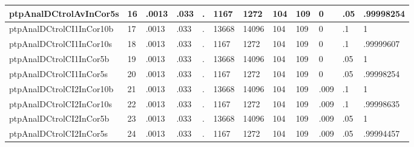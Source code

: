 \begin{table}[htbp]
\begin{tabular}{|l|l|l|l|l|l|l|l|l|l|l|l|}
ptpAnalDCtrolAvInCor5s & 16 & .0013 & .033 & . & 1167 & 1272 & 104 & 109 & 0 & .05 & .99998254 \\ \hline 
ptpAnalDCtrolCI1InCor10b & 17 & .0013 & .033 & . & 13668 & 14096 & 104 & 109 & 0 & .1 & 1 \\ \hline 
ptpAnalDCtrolCI1InCor10s & 18 & .0013 & .033 & . & 1167 & 1272 & 104 & 109 & 0 & .1 & .99999607 \\ \hline 
ptpAnalDCtrolCI1InCor5b & 19 & .0013 & .033 & . & 13668 & 14096 & 104 & 109 & 0 & .05 & 1 \\ \hline 
ptpAnalDCtrolCI1InCor5s & 20 & .0013 & .033 & . & 1167 & 1272 & 104 & 109 & 0 & .05 & .99998254 \\ \hline 
ptpAnalDCtrolCI2InCor10b & 21 & .0013 & .033 & . & 13668 & 14096 & 104 & 109 & .009 & .1 & 1 \\ \hline 
ptpAnalDCtrolCI2InCor10s & 22 & .0013 & .033 & . & 1167 & 1272 & 104 & 109 & .009 & .1 & .99998635 \\ \hline 
ptpAnalDCtrolCI2InCor5b & 23 & .0013 & .033 & . & 13668 & 14096 & 104 & 109 & .009 & .05 & 1 \\ \hline 
ptpAnalDCtrolCI2InCor5s & 24 & .0013 & .033 & . & 1167 & 1272 & 104 & 109 & .009 & .05 & .99994457 \\ \hline 
  \end{tabular}
\end{table}
